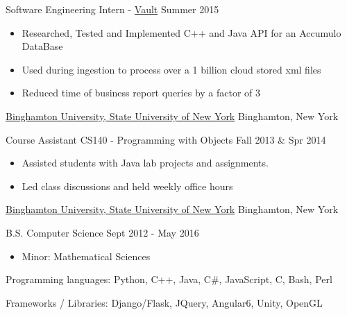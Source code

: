 \documentclass[11pt]{article}
\begin{document}
{{    }
    \headedsubsection
    {Software Engineering Intern - \href{https://www.bloomberg.com/professional/product/vault/}{Vault}}
    {Summer 2015}
    {
        \begin{itemize}
            \item Researched, Tested and Implemented C++ and Java API for an Accumulo DataBase
            \item Used during ingestion to process over a 1 billion cloud stored xml files
            \item Reduced time of business report queries by a factor of 3
        \end{itemize}
    }
}

\headedsection  %
{\href{http://www.binghamton.edu/index.php}{Binghamton University, State University of New York}}
{Binghamton, New York}
{
    \headedsubsection
    {Course Assistant CS140 - Programming with Objects}
    {Fall 2013 \& Spr 2014}
    {
        \begin{itemize}
            \item Assisted students with Java lab projects and assignments.
            \item Led class discussions and held weekly office hours
        \end{itemize}
    }
}

\spacedhrule{0.5em}{0.5em}  %

\headedsection
{\href{http://www.binghamton.edu/index.php}{Binghamton University, State University of New York}}
{Binghamton, New York} {
    \headedsubsection
    {B.S. Computer Science}
    {Sept 2012 - May 2016}
    {
        \begin{itemize}
        \item Minor: Mathematical Sciences
        \end{itemize}
    }
}


\spacedhrule{0.5em}{0.5em}  %

\inlineskillsection  %
{Programming languages:}
{ Python, C++, Java, C\#, JavaScript, C, Bash, Perl }

\inlineskillsection  
{Frameworks / Libraries:}
{ Django/Flask, JQuery, Angular6, Unity, OpenGL}
\end{document}
